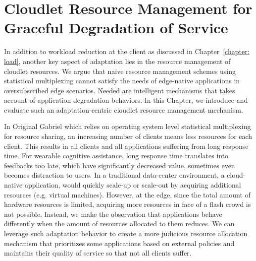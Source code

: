 \chapter{Cloudlet Resource Management for Graceful Degradation of Service}
\label{chapter: cloudlet}

In addition to workload reduction at the client as discussed in
Chapter~\ref{chapter: load}, another key aspect of adaptation lies in the
resource management of cloudlet resources. We argue that naive resource
management schemes using statistical multiplexing cannot satisfy the needs of
edge-native applications in oversubscribed edge scenarios. Needed are
intelligent mechanisms that takes account of application degradation behaviors.
In this Chapter, we introduce and evaluate such an adaptation-centric cloudlet
resource management mechanism.

In Original Gabriel which relies on operating system level statistical
multiplexing for resource sharing, an increasing number of clients means less
resources for each client. This results in all clients and all applications
suffering from long response time. For wearable cognitive assistance, long
response time translates into feedbacks too late, which have significantly
decreased value, sometimes even becomes distraction to users. In a traditional
data-center environment, a cloud-native application, would quickly scale-up or
scale-out by acquiring additional resources (e.g. virtual machines). However, at
the edge, since the total amount of hardware resources is limited, acquiring
more resources in face of a flash crowd is not possible. Instead, we make the
observation that applications behave differently when the amount of resources
allocated to them reduces. We can leverage such adaptation behavior to create a
more judicious resource allocation mechanism that prioritizes some applications
based on external policies and maintains their quality of service so that not
all clients suffer.








